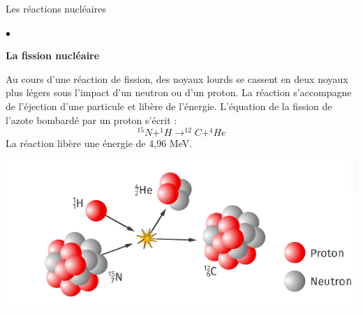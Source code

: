 \documentclass[24pt]{article}
\begin{document}
\begin{concept}{Les réactions nucléaires}
\begin{list}{$\bullet$}{}
    \end{list}

    \begin{center}
        \textbf{La fission nucléaire}
    \end{center}

    Au cours d’une réaction de fission, des noyaux lourds se cassent en deux noyaux
    plus légers sous l’impact d’un neutron ou d'un proton.
    La réaction s’accompagne de l’éjection d’une particule et libère de l’énergie.
    L’équation de la fission de l’azote bombardé par un proton s’écrit :
    $$^{15}N + ^1H \rightarrow ^{12}C + ^4He$$
    La réaction libère une énergie de 4,96 MeV.

    \begin{center}
        \includegraphics[width=0.4\columnwidth]{nuclear2.png}
    \end{center}
\end{concept}



\end{document}
